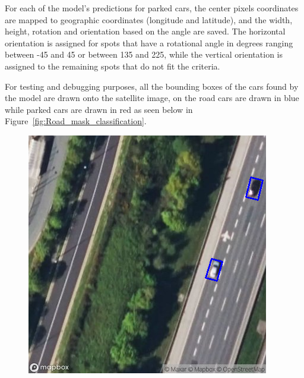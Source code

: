For each of the model's predictions for parked cars, the center pixels coordinates are mapped to geographic coordinates (longitude and latitude), and the width, height, rotation and orientation based on the angle are saved. The horizontal orientation is assigned for spots that have a rotational angle in degrees ranging between -45 and 45 or between 135 and 225, while the vertical orientation is assigned to the remaining spots that do not fit the criteria.

For testing and debugging purposes, all the bounding boxes of the cars found by the model are drawn onto the satellite image, on the road cars are drawn in blue while parked cars are drawn in red as seen below in Figure~\ref{fig:Road_mask_classification}.

\begin{figure}[htbp]
    \centering
    \begin{minipage}{0.45\textwidth}
        \centering
        \includegraphics[width=\textwidth]{images/road_mask_classification1.png}
    \end{minipage}
    \hfill
    \begin{minipage}{0.45\textwidth}
        \centering

\end{minipage}
\end{figure}
